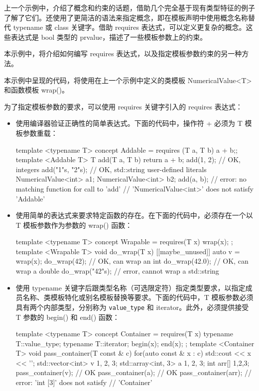 
上一个示例中，介绍了概念和约束的话题，借助几个完全基于现有类型特征的例子了解了它们。还使用了更简洁的语法来指定概念，即在模板声明中使用概念名称替代 typename 或 class 关键字。借助 requires 表达式，可以定义更复杂的概念。这些表达式是 bool 类型的 prvalue，描述了一些模板参数上的约束。

本示例中，将介绍如何编写 requires 表达式，以及指定模板参数约束的另一种方法。


本示例中呈现的代码，将使用在上一个示例中定义的类模板 NumericalValue<T> 和函数模板 wrap()。


为了指定模板参数的要求，可以使用 requires 关键字引入的 requires 表达式：

\begin{itemize}
\item
使用编译器验证正确性的简单表达式。下面的代码中，操作符 + 必须为 T 模板参数重载：

\begin{cpp}
template <typename T>
concept Addable = requires (T a, T b) {a + b;};
template <Addable T>
T add(T a, T b)
{
    return a + b;
}
add(1, 2);        // OK, integers
add("1"s, "2"s);  // OK, std::string user-defined literals
NumericalValue<int> a{1};
NumericalValue<int> b{2};
add(a, b); // error: no matching function for call to 'add'
// 'NumericalValue<int>' does not satisfy 'Addable'

\end{cpp}

\item
使用简单的表达式来要求特定函数的存在。在下面的代码中，必须存在一个以 T 模板参数作为参数的 wrap() 函数：

\begin{cpp}
template <typename T>
concept Wrapable = requires(T x) { wrap(x); };
template <Wrapable T>
void do_wrap(T x)
{
    [[maybe_unused]] auto v = wrap(x);
}
do_wrap(42);    // OK, can wrap an int
do_wrap(42.0);  // OK, can wrap a double
do_wrap("42"s); // error, cannot wrap a std::string
\end{cpp}

\item
使用 typename 关键字后跟类型名称（可选限定符）指定类型要求，以指定成员名称、类模板特化或别名模板替换等要求。下面的代码中，T 模板参数必须具有两个内部类型，分别称为 \verb|value_type| 和 iterator。此外，必须提供接受 T 参数的 begin() 和 end() 函数：

\begin{cpp}
template <typename T>
concept Container = requires(T x)
{
    typename T::value_type;
    typename T::iterator;
    begin(x);
    end(x);
};
template <Container T>
void pass_container(T const & c)
{
    for(auto const & x : c)
        std::cout << x << '\n';
}
std::vector<int> v { 1, 2, 3};
std::array<int, 3> a {1, 2, 3};
int arr[] {1,2,3};
pass_container(v);   // OK
pass_container(a);   // OK
pass_container(arr); // error: 'int [3]' does not satisfy
// 'Container'
\end{cpp}


\end{itemize}

